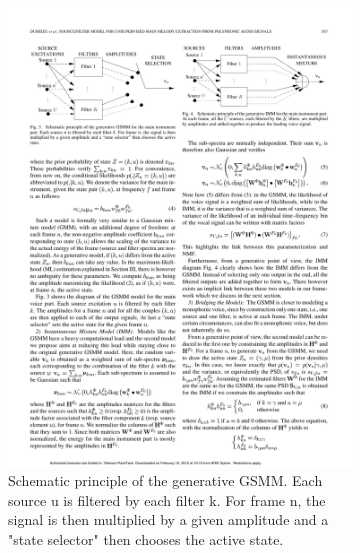 \begin{figure}
        \centering
        \begin{subfigure}[b]{0.47\textwidth}
                \includegraphics[width=\textwidth]{Figures/gsmm}
                \caption{Schematic principle of the generative GSMM. Each source u is filtered by each filter k. For frame n, the signal is then multiplied by a  given amplitude and a "state selector" then chooses the active state.}
                \label{fig:Guitar Hero screenshot}
        \end{subfigure}%
        ~ %
        \begin{subfigure}[b]{0.47\textwidth}

\end{subfigure}
\end{figure}
